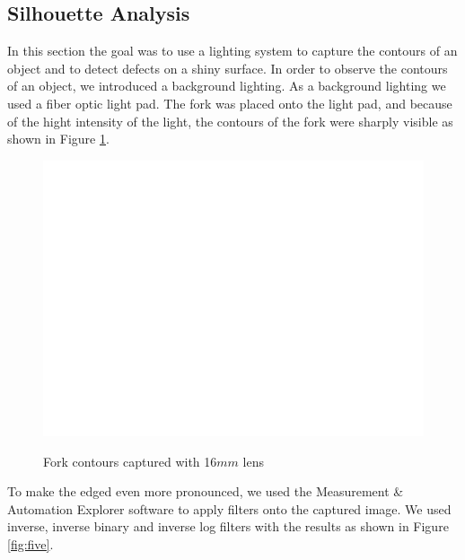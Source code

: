 \documentclass[english]{article}
\begin{document}
\subsection{Silhouette Analysis}
In this section the goal was to use a lighting system to capture the contours of an object and to detect defects on a shiny surface.
In order to observe the contours of an object, we introduced a background lighting.
As a background lighting we used a fiber optic light pad. 
The fork was placed onto the light pad, and because of the hight intensity of the light, the contours of the fork were sharply visible as shown in Figure \ref{fig:four}.\\
\begin{figure}[H]
	\centering
	{\label{fig:}
	\includegraphics[width=0.5\linewidth]		{Pictures/contour/untitled.png}
	}
	\caption{Fork contours captured with 16$mm$ lens}
	\label{fig:four}
\end{figure}
To make the edged even more pronounced, we used the Measurement \& Automation Explorer software to apply  filters onto the captured image. We used inverse, inverse binary and inverse log filters with the results as shown in Figure \ref{fig:five}.\\
\end{document}
